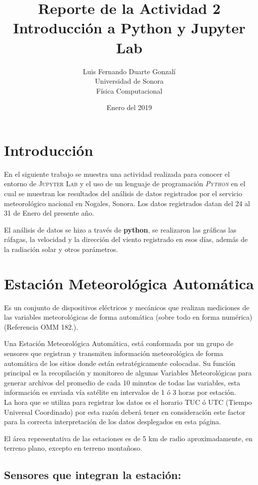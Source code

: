 \documentclass{article}
\title{\textbf{Reporte de la Actividad 2}\\ Introducción a Python y Jupyter Lab}
\author{Luis Fernando Duarte Gonzalí \\ Universidad de Sonora \\ Física Computacional}
\date{Enero del 2019}
\begin{document}
\maketitle


\section{Introducción}
\justify
En el siguiente trabajo se muestra una actividad realizada para conocer el entorno de \textsc{Jupyter Lab} y el uso de un lenguaje de programación \textit{\textsc{Python}} en el cual se muestran los resultados del análisis de datos registrados por el servicio meteorológico nacional en Nogales, Sonora. Los datos registrados datan del 24 al 31 de Enero del presente año.

El análisis de datos se hizo a través de \textbf{python}, se realizaron las gráficas las ráfagas, la velocidad y la dirección del viento registrado en esos días, además de la radiación solar y otros parámetros.

\section{Estación Meteorológica Automática}
\justify
Es un conjunto de dispositivos eléctricos y mecánicos que realizan mediciones de las variables meteorológicas de forma automática (sobre todo en forma numérica) (Referencia OMM 182.).

Una Estación Meteorológica Automática, está conformada por un grupo de  sensores  que  registran  y   transmiten  información  meteorológica de forma automática de los  sitios  donde están estratégicamente colocadas. Su  función  principal es la recopilación y  monitoreo  de algunas Variables Meteorológicas para generar archivos del promedio de cada 10 minutos de todas las variables, esta información es enviada vía satélite en intervalos de 1 ó 3 horas por estación.
\\

\noindent La hora que se utiliza para registrar los datos es  el  horario TUC ó UTC (Tiempo Universal Coordinado)  por esta razón deberá tener  en consideración este factor para la correcta interpretación de los datos desplegados en esta página.

El área representativa  de las estaciones es de 5 km de radio aproximadamente, en terreno plano, excepto en terreno montañoso.

\subsection{Sensores que integran la estación:}
\end{document}
